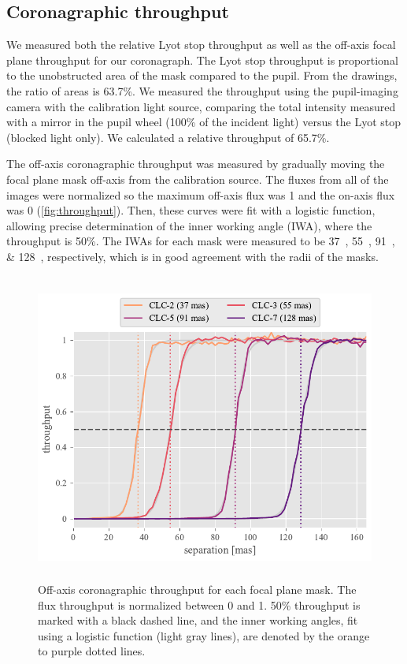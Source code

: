 \documentclass[]{spie}  %
\begin{document}
\subsection{Coronagraphic throughput}

We measured both the relative Lyot stop throughput as well as the off-axis focal plane throughput for our coronagraph. The Lyot stop throughput is proportional to the unobstructed area of the mask compared to the pupil. From the drawings, the ratio of areas is 63.7\%. We measured the throughput using the pupil-imaging camera with the calibration light source, comparing the total intensity measured with a mirror in the pupil wheel (100\% of the incident light) versus the Lyot stop (blocked light only). We calculated a relative throughput of 65.7\%.

The off-axis coronagraphic throughput was measured by gradually moving the focal plane mask off-axis from the calibration source. The fluxes from all of the images were normalized so the maximum off-axis flux was 1 and the on-axis flux was 0 (\autoref{fig:throughput}). Then, these curves were fit with a logistic function, allowing precise determination of the inner working angle (IWA), where the throughput is 50\%. The IWAs for each mask were measured to be \qtylist{37;55;91;128}{\milliarcsecond}, respectively, which is in good agreement with the radii of the masks.


\begin{figure}
   \centering
   \includegraphics[height=4in]{figures/throughput_curves}
   \caption{Off-axis coronagraphic throughput for each focal plane mask. The flux throughput is normalized between 0 and 1. 50\% throughput is marked with a black dashed line, and the inner working angles, fit using a logistic function (light gray lines), are denoted by the orange to purple dotted lines.}\label{fig:throughput}
\end{figure}
\end{document}
